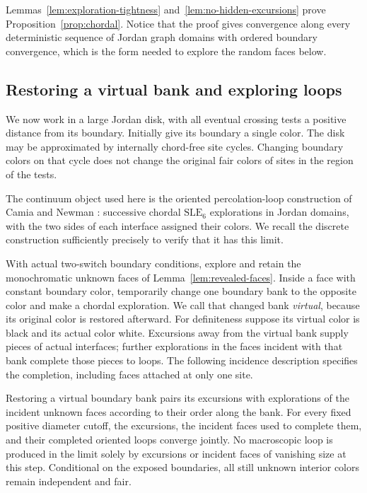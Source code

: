 Lemmas~\ref{lem:exploration-tightness} and~\ref{lem:no-hidden-excursions}
prove Proposition~\ref{prop:chordal}.  Notice that the proof gives
convergence along every deterministic sequence of Jordan graph
domains with ordered boundary convergence, which is the form needed
to explore the random faces below.

\subsection{Restoring a virtual bank and exploring loops}

We now work in a large Jordan disk, with all eventual crossing tests a
positive distance from its boundary.  Initially give its boundary a
single color.  The disk may be approximated by internally chord-free
site cycles.  Changing boundary colors on that cycle does not change
the original fair colors of sites in the region of the tests.

The continuum object used here is the oriented percolation-loop
construction of Camia and Newman \cite{cnloops}: successive chordal
$\mathrm{SLE}_6$ explorations in Jordan domains, with the two sides of
each interface assigned their colors.  We recall the discrete
construction sufficiently precisely to verify that it has this limit.

With actual two-switch boundary conditions, explore and retain the
monochromatic unknown faces of Lemma~\ref{lem:revealed-faces}.
Inside a face with constant boundary color, temporarily change one
boundary bank to the opposite color and make a chordal exploration.
We call that changed bank \emph{virtual}, because its original color
is restored afterward.  For definiteness suppose its virtual color
is black and its actual color white.  Excursions away from the virtual
bank supply pieces of actual interfaces; further explorations in
the faces incident with that bank complete those pieces to loops.
The following incidence description specifies the completion, including
faces attached at only one site.

\begin{lemma}
\label{lem:virtual-restoration}
Restoring a virtual boundary bank pairs its excursions with
explorations of the incident unknown faces according to their order
along the bank.  For every fixed positive diameter cutoff, the
excursions, the incident faces used to complete them, and their
completed oriented loops converge jointly.  No macroscopic loop
is produced in the limit solely by excursions or incident faces of
vanishing size at this step.  Conditional on the exposed boundaries,
all still unknown interior colors remain independent and fair.
\end{lemma}

